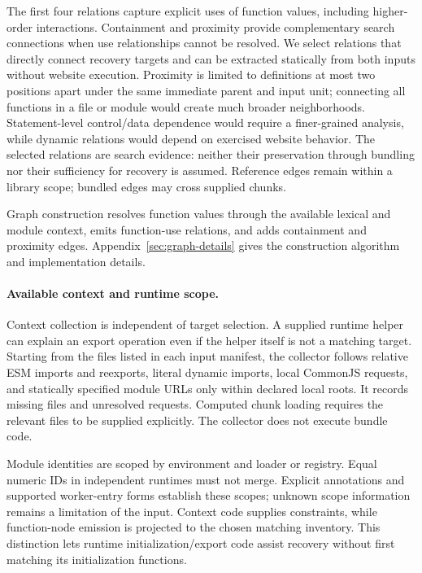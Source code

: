 The first four relations capture explicit uses of function values, including higher-order interactions. Containment and proximity provide complementary search connections when use relationships cannot be resolved. We select relations that directly connect recovery targets and can be extracted statically from both inputs without website execution. Proximity is limited to definitions at most two positions apart under the same immediate parent and input unit; connecting all functions in a file or module would create much broader neighborhoods. Statement-level control/data dependence would require a finer-grained analysis, while dynamic relations would depend on exercised website behavior. The selected relations are search evidence: neither their preservation through bundling nor their sufficiency for recovery is assumed. Reference edges remain within a library scope; bundled edges may cross supplied chunks.

Graph construction resolves function values through the available lexical and module context, emits function-use relations, and adds containment and proximity edges. Appendix~\ref{sec:graph-details} gives the construction algorithm and implementation details.

\paragraph{Available context and runtime scope.}
\label{sec:local-context}
Context collection is independent of target selection. A supplied runtime helper can explain an export operation even if the helper itself is not a matching target. Starting from the files listed in each input manifest, the collector follows relative ESM imports and reexports, literal dynamic imports, local CommonJS requests, and statically specified module URLs only within declared local roots. It records missing files and unresolved requests. Computed chunk loading requires the relevant files to be supplied explicitly. The collector does not execute bundle code.

Module identities are scoped by environment and loader or registry. Equal numeric IDs in independent runtimes must not merge. Explicit annotations and supported worker-entry forms establish these scopes; unknown scope information remains a limitation of the input. Context code supplies constraints, while function-node emission is projected to the chosen matching inventory. This distinction lets runtime initialization/export code assist recovery without first matching its initialization functions.

